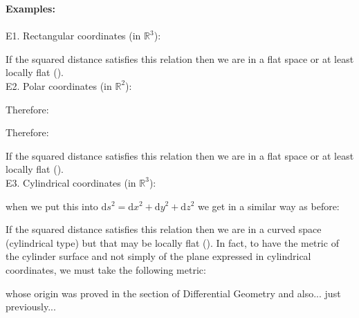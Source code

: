 	\begin{tcolorbox}[colframe=black,colback=white,sharp corners]
	\textbf{{\Large {}}Examples:}\\\\	
	E1. Rectangular coordinates (in $\mathbb{R}^3$):
	
	If the squared distance satisfies this relation then we are in a flat space or at least locally flat ().\\
	
	E2. Polar coordinates (in $\mathbb{R}^2$):
	
	Therefore:
	
	Therefore:
	
	If the squared distance satisfies this relation then we are in a flat space or at least locally flat ().\\
	
	E3. Cylindrical coordinates (in $\mathbb{R}^3$):
	
	when we put this into $\mathrm{d}s^2=\mathrm{d}x^2+\mathrm{d}y^2+\mathrm{d}z^2$ we get in a similar way as before:
	
	If the squared distance satisfies this relation then we are in a curved space (cylindrical type) but that may be locally flat (). In fact, to have the metric of the cylinder surface and not simply of the plane expressed in cylindrical coordinates, we must take the following metric:
	
	whose origin was proved in the section of Differential Geometry and also... just previously...
	\end{tcolorbox}
	
